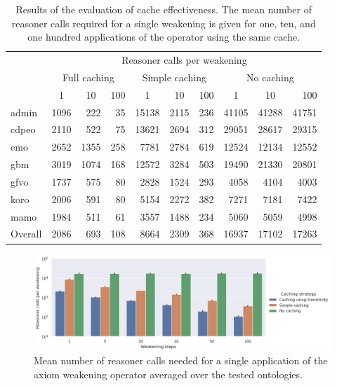 \begin{table}[ht]
  \scriptsize
  \centering
  \begin{tabular}{|l|rrr|rrr|rrr|}
    \cline{2-10}
    \multicolumn{1}{l|}{} & \multicolumn{9}{c|}{\hspace{-4mm}Reasoner calls per weakening} \\
    \multicolumn{1}{l|}{} & \multicolumn{3}{c}{Full caching} & \multicolumn{3}{c}{Simple caching} & \multicolumn{3}{c|}{No caching} \\
    \multicolumn{1}{l|}{} & \multicolumn{1}{c}{1} & \multicolumn{1}{c}{10} & \multicolumn{1}{c}{100} & \multicolumn{1}{c}{1} & \multicolumn{1}{c}{10} & \multicolumn{1}{c}{100} & \multicolumn{1}{c}{1} & \multicolumn{1}{c}{10} & 100 \\
    \hline
    admin & 1096 & 222 & 35
      & 15138 & 2115 & 236
      & 41105 & 41288 & 41751 \\
    cdpeo & 2110 & 522 & 75
      & 13621 & 2694 & 312
      & 29051 & 28617 & 29315 \\
    emo & 2652 & 1355 & 258
      & 7781 & 2784 & 619
      & 12524 & 12134 & 12552 \\
    gbm & 3019 & 1074 & 168
      & 12572 & 3284 & 503
      & 19490 & 21330 & 20801 \\
    gfvo & 1737 & 575 & 80
      & 2828 & 1524 & 293
      & 4058 & 4104 & 4003 \\
    koro & 2006 & 591 & 80
      & 5154 & 2272 & 382
      & 7271 & 7181 & 7422 \\
    mamo &  1984 & 511 & 61
      & 3557 & 1488 & 234
      & 5060 & 5059 & 4998 \\
    \hline
    Overall & 2086 & 693 & 108
      & 8664 & 2309 & 368
      & 16937 & 17102 & 17263 \\
    \hline
  \end{tabular}
  \caption{Results of the evaluation of cache effectiveness. The mean number of reasoner calls required for a single weakening is given for one, ten, and one hundred applications of the operator using the same cache.}
  \label{table:results-cache-calls}
\end{table}

\begin{figure}[ht]
  \centering
  \includegraphics[width=\textwidth]{resources/calls-cache-bar.png}
  \caption{Mean number of reasoner calls needed for a single application of the axiom weakening operator averaged over the tested ontologies.}
  \label{fig:results-cache-calls}
\end{figure}

